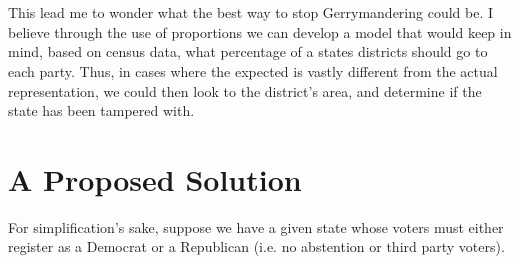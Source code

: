 \documentclass[12pt]{article}
\begin{document}
	\\
	\\This lead me to wonder what the best way to stop Gerrymandering could be.  I believe through the use of proportions we can develop a model that would keep in mind, based on census data, what percentage of a states districts should go to each party.  Thus, in cases where the expected is vastly different from the actual representation, we could then look to the district's area, and determine if the state has been tampered with.
	
	\section{A Proposed Solution}
	For simplification's sake, suppose we have a given state whose voters must either register as a Democrat or a Republican (i.e. no abstention or third party voters).  
	
\end{document}
